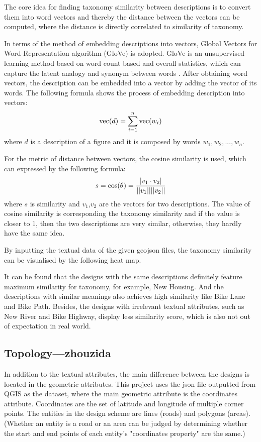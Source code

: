 The core idea for finding taxonomy similarity between descriptions is to convert them into word vectors and thereby the distance between the vectors can be computed, where the distance is directly correlated to similarity of taxonomy.
\par
In terms of the method of embedding descriptions into vectors, Global Vectors for Word Representation algorithm (GloVe) is adopted. GloVe is an unsupervised learning method based on word count based and overall statistics, which can capture the latent analogy and synonym between words \cite{pennington2014glove}. After obtaining word vectors, the description can be embedded into a vector by adding the vector of its words. The following formula shows the process of embedding description into vectors:
$${\rm vec}(d)=\sum_{i=1}^{n}{\rm vec}(w_i)$$
where $d$ is a description of a figure and it is composed by words $w_1,w_2,...,w_n$.
\par
For the metric of distance between vectors, the cosine similarity is used, which can expressed by the following formula:
$$s={\rm cos}(\theta)=\frac{|v_1\cdot v_2|}{||v_1||||v_2||}$$
where $s$ is similarity and $v_1$,$v_2$ are the vectors for two descriptions. The value of cosine similarity is corresponding the taxonomy similarity and if the value is closer to 1, then the two descriptions are very similar, otherwise, they hardly have the same idea. 
\par
By inputting the textual data of the given geojson files, the taxonomy similarity can be visualised by the following heat map.
\par
It can be found that the designs with the same descriptions definitely feature maximum similarity for taxonomy, for example, New Housing. And the descriptions with similar meanings also achieves high similarity like Bike Lane and Bike Path. Besides, the designs with irrelevant textual attributes, such as New River and Bike Highway, display less similarity score, which is also not out of expectation in real world. 
\subsection*{Topology---zhouzida}
In addition to the textual attributes, the main difference between the designs is located in the geometric attributes. This project uses the json file outputted from QGIS as the dataset, where the main geometric attribute is the coordinates attribute. Coordinates are the set of latitude and longitude of multiple corner points. The entities in the design scheme are lines (roads) and polygons (areas). (Whether an entity is a road or an area can be judged by determining whether the start and end points of each entity's "coordinates property" are the same.)


